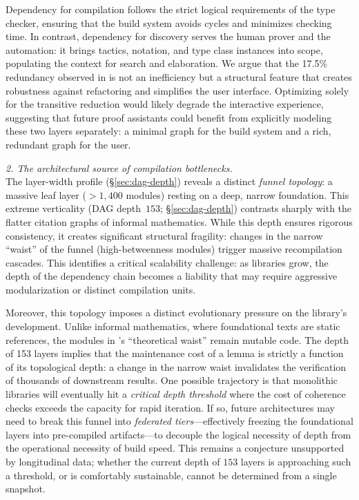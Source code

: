 Dependency for compilation follows the strict logical requirements of the type checker, ensuring that the build system avoids cycles and minimizes checking time. In contrast, dependency for discovery serves the human prover and the automation: it brings tactics, notation, and type class instances into scope, populating the context for search and elaboration. We argue that the 17.5\% redundancy observed in  is not an inefficiency but a structural feature that creates robustness against refactoring and simplifies the user interface. Optimizing solely for the transitive reduction would likely degrade the interactive experience, suggesting that future proof assistants could benefit from explicitly modeling these two layers separately: a minimal graph for the build system and a rich, redundant graph for the user.

\medskip
\noindent \textit{2. The architectural source of compilation bottlenecks.} \\
The layer-width profile (\S\ref{sec:dag-depth}) reveals a distinct \textit{funnel topology}: a massive leaf layer ($>1,400$ modules) resting on a deep, narrow foundation. This extreme verticality (DAG depth~$153$; \S\ref{sec:dag-depth}) contrasts sharply with the flatter citation graphs of informal mathematics. While this depth ensures rigorous consistency, it creates significant structural fragility: changes in the narrow ``waist'' of the funnel (high-betweenness modules) trigger massive recompilation cascades. This identifies a critical scalability challenge: as libraries grow, the depth of the dependency chain becomes a liability that may require aggressive modularization or distinct compilation units.

Moreover, this topology imposes a distinct evolutionary pressure on the library's development. Unlike informal mathematics, where foundational texts are static references, the modules in 's ``theoretical waist'' remain mutable code. The depth of 153 layers implies that the maintenance cost of a lemma is strictly a function of its topological depth: a change in the narrow waist invalidates the verification of thousands of downstream results. One possible trajectory is that monolithic libraries will eventually hit a \textit{critical depth threshold} where the cost of coherence checks exceeds the capacity for rapid iteration. If so, future architectures may need to break this funnel into \textit{federated tiers}---effectively freezing the foundational layers into pre-compiled artifacts---to decouple the logical necessity of depth from the operational necessity of build speed. This remains a conjecture unsupported by longitudinal data; whether the current depth of $153$ layers is approaching such a threshold, or is comfortably sustainable, cannot be determined from a single snapshot.

